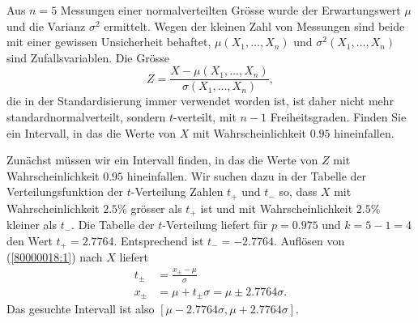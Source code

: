 Aus $n=5$ Messungen einer normalverteilten Grösse wurde der Erwartungswert
$\mu$ und die Varianz $\sigma^2$ ermittelt.
Wegen der kleinen Zahl von Messungen sind beide mit einer gewissen
Unsicherheit behaftet, $\mu(X_1,\dots,X_n)$ und  $\sigma^2(X_1,\dots,X_n)$
sind Zufallsvariablen.
Die Grösse
\begin{equation}
Z=\frac{X-\mu(X_1,\dots,X_n)}{\sigma(X_1,\dots,X_n)},
\label{80000018:1}
\end{equation}
die in der Standardisierung immer verwendet worden ist, ist daher
nicht mehr standardnormalverteilt, sondern $t$-verteilt, mit $n-1$ 
Freiheitsgraden. Finden Sie ein Intervall, in das die Werte von $X$
mit Wahrscheinlichkeit $0.95$ hineinfallen.


\begin{loesung}
Zunächst müssen wir ein Intervall finden, in das die Werte von
$Z$ mit Wahrscheinlichkeit $0.95$ hineinfallen. Wir suchen dazu in
der Tabelle der Verteilungsfunktion der $t$-Verteilung Zahlen $t_+$
und $t_-$ so, dass $X$ mit Wahrscheinlichkeit $2.5\%$ grösser als $t_+$
ist und mit Wahrscheinlichkeit $2.5\%$ kleiner als $t_-$. Die Tabelle
der $t$-Verteilung liefert für $p=0.975$ und $k=5-1=4$ den Wert
$t_+=2.7764$. Entsprechend ist $t_-=-2.7764$. Auflösen von
(\ref{80000018:1}) nach $X$ liefert
\begin{align*}
t_\pm &=\frac{x_{\pm}-\mu}{\sigma}\\
x_\pm&=\mu +t_\pm\sigma = \mu \pm 2.7764\sigma.
\end{align*}
Das gesuchte Intervall ist also $[\mu-2.7764\sigma,\mu+2.7764\sigma]$.
\end{loesung}
